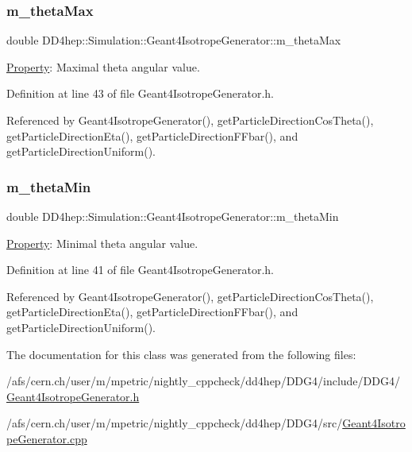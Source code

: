 \subsubsection{\texorpdfstring{m\+\_\+theta\+Max}{m\_thetaMax}}
{\footnotesize\ttfamily double D\+D4hep\+::\+Simulation\+::\+Geant4\+Isotrope\+Generator\+::m\+\_\+theta\+Max\hspace{0.3cm}{\ttfamily [protected]}}



\hyperlink{class_d_d4hep_1_1_property}{Property}\+: Maximal theta angular value. 



Definition at line 43 of file Geant4\+Isotrope\+Generator.\+h.



Referenced by Geant4\+Isotrope\+Generator(), get\+Particle\+Direction\+Cos\+Theta(), get\+Particle\+Direction\+Eta(), get\+Particle\+Direction\+F\+Fbar(), and get\+Particle\+Direction\+Uniform().

\hypertarget{class_d_d4hep_1_1_simulation_1_1_geant4_isotrope_generator_adc75b47a005e8632d01d3db7b408de4c}{}\label{class_d_d4hep_1_1_simulation_1_1_geant4_isotrope_generator_adc75b47a005e8632d01d3db7b408de4c} 
\subsubsection{\texorpdfstring{m\+\_\+theta\+Min}{m\_thetaMin}}
{\footnotesize\ttfamily double D\+D4hep\+::\+Simulation\+::\+Geant4\+Isotrope\+Generator\+::m\+\_\+theta\+Min\hspace{0.3cm}{\ttfamily [protected]}}



\hyperlink{class_d_d4hep_1_1_property}{Property}\+: Minimal theta angular value. 



Definition at line 41 of file Geant4\+Isotrope\+Generator.\+h.



Referenced by Geant4\+Isotrope\+Generator(), get\+Particle\+Direction\+Cos\+Theta(), get\+Particle\+Direction\+Eta(), get\+Particle\+Direction\+F\+Fbar(), and get\+Particle\+Direction\+Uniform().



The documentation for this class was generated from the following files\+:\begin{DoxyCompactItemize}
\item 
/afs/cern.\+ch/user/m/mpetric/nightly\+\_\+cppcheck/dd4hep/\+D\+D\+G4/include/\+D\+D\+G4/\hyperlink{_geant4_isotrope_generator_8h}{Geant4\+Isotrope\+Generator.\+h}\item 
/afs/cern.\+ch/user/m/mpetric/nightly\+\_\+cppcheck/dd4hep/\+D\+D\+G4/src/\hyperlink{_geant4_isotrope_generator_8cpp}{Geant4\+Isotrope\+Generator.\+cpp}\end{DoxyCompactItemize}

